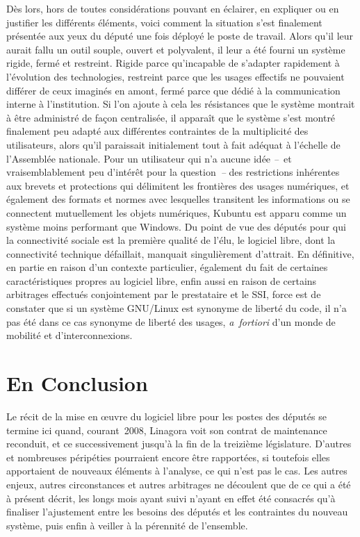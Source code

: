 \documentclass{FramateX}
\begin{document}
\begin{refsection}
Dès lors, hors de toutes considérations pouvant en éclairer, en
expliquer ou en justifier les différents éléments, voici comment la
situation s'est finalement présentée aux yeux du député une fois
déployé le poste de travail. Alors qu'il leur aurait fallu un outil
souple, ouvert et polyvalent, il leur a été fourni un système rigide,
fermé et restreint. Rigide parce qu'incapable de s'adapter rapidement à
l'évolution des technologies, restreint parce que les usages effectifs
ne pouvaient différer de ceux imaginés en amont, fermé parce que dédié
à la communication interne à l'institution. Si l'on ajoute à cela les
résistances que le système montrait à être administré de façon
centralisée, il apparaît que le système s'est montré finalement peu
adapté aux différentes contraintes de la multiplicité des utilisateurs,
alors qu'il paraissait initialement tout à fait adéquat à l'échelle de
l'Assemblée nationale. Pour un utilisateur qui n'a aucune idée
\textit{–~}et vraisemblablement peu d'intérêt pour la
question~\textit{–} des restrictions inhérentes aux brevets et
protections qui délimitent les frontières des usages numériques, et
également des formats et normes avec lesquelles transitent les
informations ou se connectent mutuellement les objets numériques,
Kubuntu est apparu comme un système moins performant que Windows. Du
point de vue des députés pour qui la connectivité sociale est la
première qualité de l'élu, le logiciel libre, dont la connectivité
technique défaillait, manquait singulièrement d'attrait. En définitive,
en partie en raison d'un contexte particulier, également du fait de
certaines caractéristiques propres au logiciel libre, enfin aussi en
raison de certains arbitrages effectués conjointement par le
prestataire et le SSI, force est de constater que si un système
GNU/Linux est synonyme de liberté du code, il n'a pas été dans ce cas
synonyme de liberté des usages, \textit{a~fortiori} d'un monde de
mobilité et d'interconnexions. 

\section*{En Conclusion}
{}

Le récit de la mise en œuvre du logiciel libre pour les postes des
députés se termine ici quand, courant~2008, Linagora voit son contrat
de maintenance reconduit, et ce successivement jusqu'à la fin de la
treizième législature. D'autres et nombreuses péripéties pourraient
encore être rapportées, si toutefois elles apportaient de nouveaux
éléments à l'analyse, ce qui n'est pas le cas. Les autres enjeux,
autres circonstances et autres arbitrages ne découlent que de ce qui a
été à présent décrit, les longs mois ayant suivi n'ayant en effet été
consacrés qu'à finaliser l'ajustement entre les besoins des députés et
les contraintes du nouveau système, puis enfin à veiller à la pérennité
de l'ensemble. 


\end{refsection}
\end{document}
